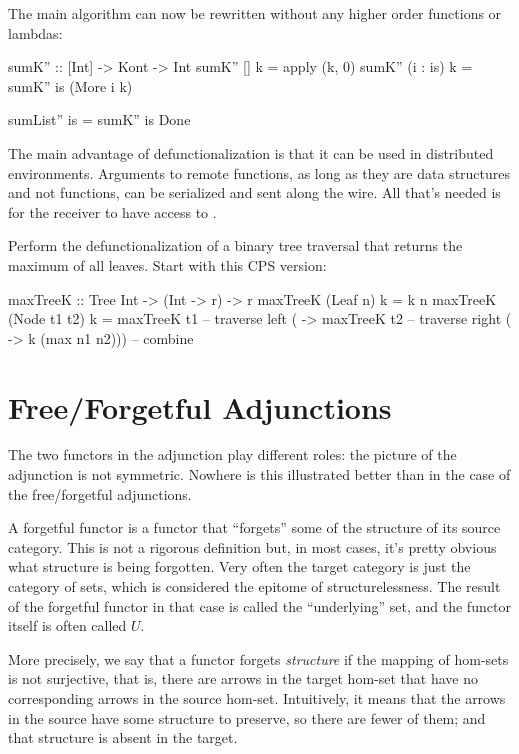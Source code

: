 \documentclass[DaoFP]{subfiles}
\begin{document}
The main algorithm can now be rewritten without any higher order functions or lambdas:
\begin{haskell}
sumK'' :: [Int] -> Kont -> Int
sumK'' [] k = apply (k, 0)
sumK'' (i : is) k = sumK'' is (More i k)
\end{haskell}

\begin{haskell}
sumList'' is = sumK'' is Done
\end{haskell}

The main advantage of defunctionalization is that it can be used in distributed environments. Arguments to remote functions, as long as they are data structures and not functions, can be serialized and sent along the wire. All that's needed is for the receiver to have access to . 
\begin{exercise}
Perform the defunctionalization of a binary tree traversal that returns the maximum of all leaves. Start with this CPS version:
\begin{haskell}
maxTreeK :: Tree Int -> (Int -> r) -> r
maxTreeK (Leaf n) k = k n
maxTreeK (Node t1 t2) k = maxTreeK t1    -- traverse left
  ( -> maxTreeK t2                    -- traverse right
    ( -> k (max n1 n2)))              -- combine
\end{haskell}
\end{exercise}

\section{Free/Forgetful Adjunctions}
The two functors in the adjunction play different roles: the picture of the adjunction is not symmetric. Nowhere is this illustrated better than in the case of the free/forgetful adjunctions. 

A forgetful functor is a functor that ``forgets'' some of the structure of its source category. This is not a rigorous definition but, in most cases, it's pretty obvious what structure is being forgotten. Very often the target category is just the category of sets, which is considered the epitome of structurelessness. The result of the forgetful functor in that case is called the ``underlying'' set, and the functor itself is often called $U$. 

More precisely, we say that a functor forgets \emph{structure} if the mapping of hom-sets is not surjective, that is, there are arrows in the target hom-set that have no corresponding arrows in the source hom-set. Intuitively, it means that the arrows in the source have some structure to preserve, so there are fewer of them; and that structure is absent in the target. 
\end{document}

